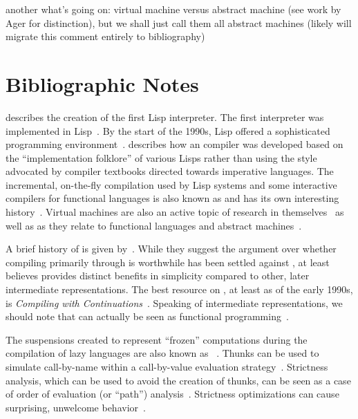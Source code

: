 another what's going on: virtual machine versus abstract machine (see work by Ager for distinction), but we shall just call them all abstract machines (likely will migrate this comment entirely to bibliography)

\section{Bibliographic Notes}
 describes the creation of the first Lisp interpreter. The first interpreter was implemented in Lisp~\citep[see][footnote~5]{Gordon:From:2000}. By the start of the 1990s, Lisp offered a sophisticated programming environment~\citep{Layer:Lisp:1991}.  describes how an  compiler was developed based on the ``implementation folklore'' of various Lisps rather than using the style advocated by compiler textbooks directed towards imperative languages. The incremental, on-the-fly compilation used by Lisp systems and some interactive compilers for functional languages is also known as  and has its own interesting history~\citep{Aycock:A-brief:2003}. Virtual machines are also an active topic of research in themselves~\citep{Shi:Virtual:2008} as well as as they relate to functional languages and abstract machines~\citep{Danvy:A-journey:2003,Ager:A-functional:2003,Ager:A-Functional:2003a,Ager:A-Functional:2004,Ager:From:2003}.

A brief history of \CPS is given by~\citet{Flanagan:The-essence:2004}. While they suggest the argument over whether compiling primarily through \CPS is worthwhile has been settled against \CPS, \citet{Kennedy:Compiling:2007} at least believes \CPS provides distinct benefits in simplicity compared to other, later intermediate representations. The best resource on \CPS{}, at least as of the early 1990s, is \textit{Compiling with Continuations}~\citep{Appel:Compiling:1992}. Speaking of intermediate representations, we should note that \SSA can actually be seen as functional programming~\citep{Appel:Compiling:1992}.

The suspensions created to represent ``frozen'' computations during the compilation of lazy languages are also known as ~\citep{Ingerman:Thunks:1961}. Thunks can be used to simulate call-by-name within a call-by-value evaluation strategy~\citep{Hatcliff:Thunks:1997}. Strictness analysis, which can be used to avoid the creation of thunks, can be seen as a case of order of evaluation (or ``path'') analysis~\citep{Bloss:Path:1994}. Strictness optimizations can cause surprising, unwelcome behavior~\citep{Beemster:Strictness:1994}.


